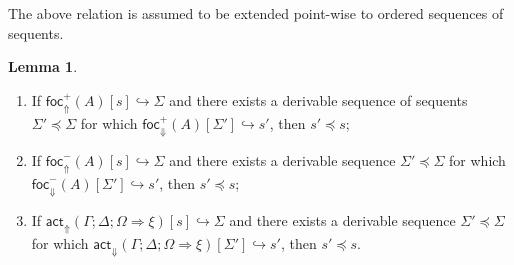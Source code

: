 \documentclass{article}
\theoremstyle{definition}
\newtheorem{lemma}{Lemma}
\newcommand{\brfrel}[1]{\textsf{foc}^+_{\Uparrow}(#1)}
\newcommand{\blfrel}[1]{\textsf{foc}^-_{\Uparrow}(#1)}
\newcommand{\bactrel}[1]{\textsf{act}_{\Uparrow}(#1)}
\newcommand{\frfrel}[1]{\textsf{foc}^+_{\Downarrow}(#1)}
\newcommand{\flfrel}[1]{\textsf{foc}^-_{\Downarrow}(#1)}
\newcommand{\factrel}[1]{\textsf{act}_{\Downarrow}(#1)}
\newcommand{\relj}[3]{#1 [#2] \hookrightarrow #3}
\newcommand{\brfrelj}[3]{\relj{\brfrel{#1}}{#2}{#3}}
\newcommand{\blfrelj}[3]{\relj{\blfrel{#1}}{#2}{#3}}
\newcommand{\bactrelj}[3]{\relj{\bactrel{#1}}{#2}{#3}}
\newcommand{\frfrelj}[3]{\relj{\frfrel{#1}}{#2}{#3}}
\newcommand{\flfrelj}[3]{\relj{\flfrel{#1}}{#2}{#3}}
\newcommand{\factrelj}[3]{\relj{\factrel{#1}}{#2}{#3}}
\newcommand{\btriseq}[4]{#1; #2; #3 \Longrightarrow #4}
\begin{document}
The above relation is assumed to be extended point-wise to ordered sequences of
sequents.

\begin{lemma}\label{fdercompllemma}
  \begin{enumerate}
  \item If $\brfrelj{A}{s}{\Sigma}$ and there exists a derivable sequence of
    sequents $\Sigma' \preceq \Sigma$ for which $\frfrelj{A}{\Sigma'}{s'}$, then
    $s' \preceq s$;
  \item If $\blfrelj{A}{s}{\Sigma}$ and there exists a derivable sequence
    $\Sigma' \preceq \Sigma$ for which $\flfrelj{A}{\Sigma'}{s'}$, then $s'
    \preceq s$;
  \item If $\bactrelj{\btriseq{\Gamma}{\Delta}{\Omega}{\xi}}{s}{\Sigma}$ and
    there exists a derivable sequence $\Sigma' \preceq \Sigma$ for which
    $\factrelj{\btriseq{\Gamma}{\Delta}{\Omega}{\xi}}{\Sigma'}{s'}$, then
    $s' \preceq s$.
  \end{enumerate}
\end{lemma}
\end{document}
